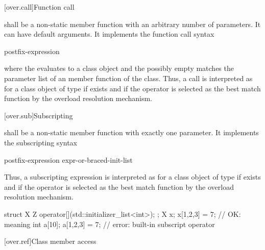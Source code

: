 [over.call]{Function call}%
%

\pnum
{}
shall be a non-static member function with an arbitrary number of
parameters.
It can have default arguments.
It implements the function call syntax

\begin{ncsimplebnf}
postfix-expression \terminal{(}  \terminal{)}
\end{ncsimplebnf}

where the
evaluates to a class object and the possibly empty
matches the parameter list of an
member function of the class.
Thus, a call
is interpreted as
for a class object
of type
if
exists and if the operator is selected as the best match function by
the overload resolution mechanism.

[over.sub]{Subscripting}%
%

\pnum
{}
shall be a non-static member function with exactly one parameter.
It implements the subscripting syntax

\begin{ncsimplebnf}
postfix-expression \terminal{[} expr-or-braced-init-list \terminal{]}
\end{ncsimplebnf}

Thus, a subscripting expression
is interpreted as
for a class object
of type
if
exists and if the operator is selected as the best match function by
the overload resolution mechanism.
\begin{example}
\begin{codeblock}
struct X {
  Z operator[](std::initializer_list<int>);
};
X x;
x[{1,2,3}] = 7;                 // OK: meaning 
int a[10];
a[{1,2,3}] = 7;                 // error: built-in subscript operator
\end{codeblock}
\end{example}

[over.ref]{Class member access}
%

